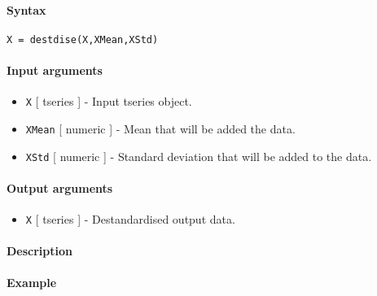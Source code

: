 


	\paragraph{Syntax}

\begin{verbatim}
X = destdise(X,XMean,XStd)
\end{verbatim}

\paragraph{Input arguments}

\begin{itemize}
\item
  \texttt{X} {[} tseries {]} - Input tseries object.
\item
  \texttt{XMean} {[} numeric {]} - Mean that will be added the data.
\item
  \texttt{XStd} {[} numeric {]} - Standard deviation that will be added
  to the data.
\end{itemize}

\paragraph{Output arguments}

\begin{itemize}
\itemsep1pt\parskip0pt
\item
  \texttt{X} {[} tseries {]} - Destandardised output data.
\end{itemize}

\paragraph{Description}

\paragraph{Example}


